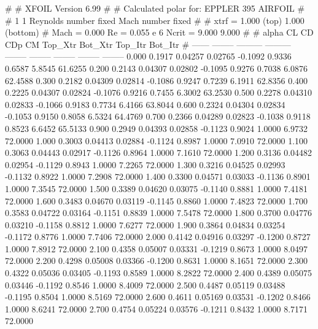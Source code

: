 #  
#       XFOIL         Version 6.99
#  
# Calculated polar for: EPPLER 395 AIRFOIL                              
#  
# 1 1 Reynolds number fixed          Mach number fixed         
#  
# xtrf =   1.000 (top)        1.000 (bottom)  
# Mach =   0.000     Re =     0.055 e 6     Ncrit =   9.000  9.000
#  
#   alpha    CL        CD       CDp       CM     Top_Xtr  Bot_Xtr  Top_Itr  Bot_Itr
#  ------ -------- --------- --------- -------- -------- -------- -------- --------
   0.000   0.1917   0.04257   0.02765  -0.1092   0.9336   0.6587   5.8545  61.6255
   0.200   0.2143   0.04307   0.02802  -0.1095   0.9276   0.7038   6.0876  62.4588
   0.300   0.2182   0.04309   0.02814  -0.1086   0.9247   0.7239   6.1911  62.8356
   0.400   0.2225   0.04307   0.02824  -0.1076   0.9216   0.7455   6.3002  63.2530
   0.500   0.2278   0.04310   0.02833  -0.1066   0.9183   0.7734   6.4166  63.8044
   0.600   0.2324   0.04304   0.02834  -0.1053   0.9150   0.8058   6.5324  64.4769
   0.700   0.2366   0.04289   0.02823  -0.1038   0.9118   0.8523   6.6452  65.5133
   0.900   0.2949   0.04393   0.02858  -0.1123   0.9024   1.0000   6.9732  72.0000
   1.000   0.3003   0.04413   0.02884  -0.1124   0.8987   1.0000   7.0910  72.0000
   1.100   0.3063   0.04443   0.02917  -0.1126   0.8964   1.0000   7.1610  72.0000
   1.200   0.3136   0.04482   0.02954  -0.1129   0.8943   1.0000   7.2265  72.0000
   1.300   0.3216   0.04525   0.02993  -0.1132   0.8922   1.0000   7.2908  72.0000
   1.400   0.3300   0.04571   0.03033  -0.1136   0.8901   1.0000   7.3545  72.0000
   1.500   0.3389   0.04620   0.03075  -0.1140   0.8881   1.0000   7.4181  72.0000
   1.600   0.3483   0.04670   0.03119  -0.1145   0.8860   1.0000   7.4823  72.0000
   1.700   0.3583   0.04722   0.03164  -0.1151   0.8839   1.0000   7.5478  72.0000
   1.800   0.3700   0.04776   0.03210  -0.1158   0.8812   1.0000   7.6277  72.0000
   1.900   0.3864   0.04834   0.03254  -0.1172   0.8776   1.0000   7.7406  72.0000
   2.000   0.4142   0.04916   0.03297  -0.1200   0.8727   1.0000   7.8912  72.0000
   2.100   0.4358   0.05007   0.03331  -0.1219   0.8673   1.0000   8.0497  72.0000
   2.200   0.4298   0.05008   0.03366  -0.1200   0.8631   1.0000   8.1651  72.0000
   2.300   0.4322   0.05036   0.03405  -0.1193   0.8589   1.0000   8.2822  72.0000
   2.400   0.4389   0.05075   0.03446  -0.1192   0.8546   1.0000   8.4009  72.0000
   2.500   0.4487   0.05119   0.03488  -0.1195   0.8504   1.0000   8.5169  72.0000
   2.600   0.4611   0.05169   0.03531  -0.1202   0.8466   1.0000   8.6241  72.0000
   2.700   0.4754   0.05224   0.03576  -0.1211   0.8432   1.0000   8.7171  72.0000
